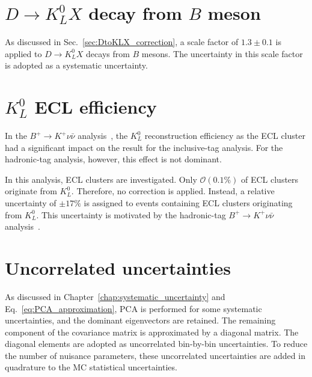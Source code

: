 \section{$D\rightarrow K_{L}^{0}X$ decay from $B$ meson}
As discussed in Sec.~\ref{sec:DtoKLX_correction}, a scale factor of $1.3\pm0.1$ is applied to $D\rightarrow K_{L}^{0}X$ decays from $B$ mesons.
The uncertainty in this scale factor is adopted as a systematic uncertainty.

\section{$K_{L}^{0}$ ECL efficiency}
In the $B^{+} \rightarrow K^{+} \nu \bar{\nu}$ analysis~\cite{Belle-II:2023esi}, the $K_{L}^{0}$ reconstruction efficiency as the ECL cluster had a significant impact on the result for the inclusive-tag analysis.
For the hadronic-tag analysis, however, this effect is not dominant.

In this analysis, ECL clusters are investigated.
Only $\mathcal{O}(0.1\%)$ of ECL clusters originate from $K_{L}^{0}$.
Therefore, no correction is applied.
Instead, a relative uncertainty of $\pm17\%$ is assigned to events containing ECL clusters originating from $K_{L}^{0}$.
This uncertainty is motivated by the hadronic-tag $B^{+} \rightarrow K^{+} \nu \bar{\nu}$ analysis~\cite{Belle-II:2023esi}.

\section{Uncorrelated uncertainties}
As discussed in Chapter~\ref{chap:systematic_uncertainty} and Eq.~\ref{eq:PCA_approximation}, PCA is performed for some systematic uncertainties, and the dominant eigenvectors are retained.
The remaining component of the covariance matrix is approximated by a diagonal matrix.
The diagonal elements are adopted as uncorrelated bin-by-bin uncertainties.
To reduce the number of nuisance parameters, these uncorrelated uncertainties are added in quadrature to the MC statistical uncertainties.


